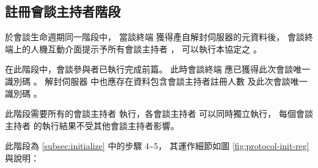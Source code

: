\subsection{註冊會談主持者階段}\label{subsec:protocol-init-reg}

    於會談生命週期同一階段中，
當談終端 \DEFmeetingbox 獲得產自解封伺服器的元資料後，
會談終端上的人機互動介面提示予所有會談主持者 \DEFownerAll，
可以執行本協定之 。

    在此階段中，會談參與者已執行完成前篇。
此時會談終端 \DEFmeetingbox 應已獲得此次會談唯一識別碼 \DEFsessionID。
解封伺服器 \DEFserver 中也應存在資料包含會談主持者註冊人數 \DEFowreg 及此次會談唯一識別碼 \DEFsessionID。

    此階段需要所有的會談主持者 \DEFownerAll 執行，各會談主持者 \DEFowner 可以同時獨立執行，
每個會談主持者 \DEFowner 的執行結果不受其他會談主持者影響。

    此階段為 \ref{subsec:initialize} 中的步驟 4\textasciitilde5，
其運作細節如圖 \ref{fig:protocol-init-reg}與說明：

